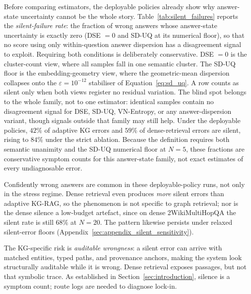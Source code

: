 Before comparing estimators, the deployable policies already show why
answer-state uncertainty cannot be the whole story.
Table~\ref{tab:silent_failures} reports the \emph{silent-failure rate}: the
fraction of wrong answers whose answer-state uncertainty is exactly zero
(DSE $= 0$ and SD-UQ at its numerical floor), so that no score using only
within-question answer dispersion has a disagreement signal to exploit.
Requiring both conditions is deliberately conservative. DSE $=0$ is the
cluster-count view, where all samples fall in one semantic cluster. The SD-UQ
floor is the embedding-geometry view, where the geometric-mean dispersion
collapses onto the $\varepsilon = 10^{-12}$ stabiliser of
Equation~\eqref{eq:sd_uq}. A row counts as silent only when both views register
no residual variation.
The blind spot belongs to the whole family, not to one estimator: identical
samples contain no disagreement signal for DSE, SD-UQ, VN-Entropy, or any
answer-dispersion variant, though signals outside that family may still help.
Under the deployable policies, $42\%$ of adaptive KG errors and $59\%$ of
dense-retrieval errors are silent, rising to $84\%$ under the strict ablation.
Because the definition requires both semantic unanimity and the SD-UQ numerical
floor at $N=5$, these fractions are conservative symptom counts for this
answer-state family, not exact estimates of every undiagnosable error.

Confidently wrong answers are common in these deployable-policy runs, not only
in the stress regime.
Dense retrieval even produces \emph{more} silent errors than adaptive KG-RAG, so
the phenomenon is not specific to graph retrieval; nor is the dense silence a
low-budget artefact, since on dense 2WikiMultiHopQA the silent rate is still
$68\%$ at $N{=}20$.
The pattern likewise persists under relaxed silent-error floors
(Appendix~\ref{sec:appendix_silent_sensitivity}).

The KG-specific risk is \emph{auditable wrongness}: a silent error can arrive
with matched entities, typed paths, and
provenance anchors, making the system look structurally auditable while it is
wrong. Dense retrieval exposes passages, but not that symbolic trace.
As established in Section~\ref{sec:introduction}, silence is a symptom count;
route logs are needed to diagnose lock-in.

